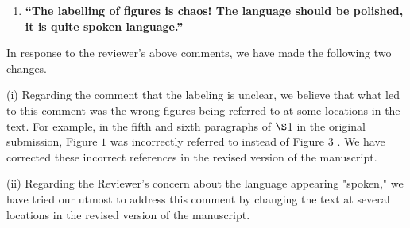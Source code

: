 \documentclass[11pt,letterpaper]{report}
\begin{document}
\begin{enumerate}[label=\textit{1.\arabic*},wide, labelwidth=!, labelindent=0pt]
\begin{enumerate}[label=\textit{2.\arabic*},wide, labelindent=0pt]


\newpage
\item \label{r2c2}{\bf ``The labelling of figures is chaos! The language should be polished, it is quite spoken language.''}
\end{enumerate}

In response to the reviewer's above comments, we have made the following two changes.

(i) Regarding the comment that the labeling is unclear, we believe that what led to this comment was the wrong figures being referred to at some locations in the text. For example, in the fifth and sixth paragraphs of $\S$1 in the original submission, Figure $1$ was incorrectly referred to instead of Figure $3$ . We have corrected these incorrect references in the revised version of the manuscript.

(ii) Regarding the Reviewer's concern about the language appearing "spoken," we have tried our utmost to address this comment by changing the text at several locations in the revised version of the manuscript.


\end{enumerate}

\clearpage



\end{document}
